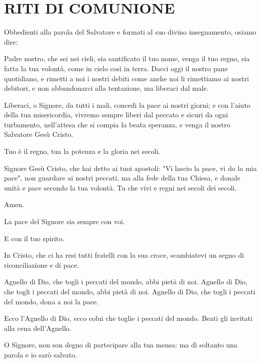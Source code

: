 

\section*{RITI DI COMUNIONE}

	\begin{dialoghi}
		\item[\sacerdote] Obbedienti alla parola del Salvatore e formati al suo divino insegnamento, osiamo dire:
		\item[\assemblea] Padre nostro, che sei nei cieli, sia santificato il tuo nome, venga il tuo regno, sia fatta la tua volontà, come in cielo così in terra. Dacci oggi il nostro pane quotidiano, e rimetti a noi i nostri debiti come anche noi li rimettiamo ai nostri debitori, e non abbandonarci alla tentazione, ma liberaci dal male.
		\item[\sacerdote] Liberaci, o Signore, da tutti i mali, concedi la pace ai nostri giorni; e con l'aiuto della tua misericordia, vivremo sempre liberi dal peccato e sicuri da ogni turbamento, nell'attesa che si compia la beata speranza, e venga il nostro Salvatore Gesù Cristo.
		\item[\assemblea] Tuo è il regno, tua la potenza e la gloria nei secoli.
		\item[\sacerdote] Signore Gesù Cristo, che hai detto ai tuoi apostoli: "Vi lascio la pace, vi do la mia pace", non guardare ai nostri peccati, ma alla fede della tua Chiesa, e donale unità e pace secondo la tua volontà. Tu che vivi e regni nei secoli dei secoli.
		\item[\assemblea] Amen.
		\item[\sacerdote] La pace del Signore sia sempre con voi.
		\item[\assemblea] E con il tuo spirito.
		\item[\sacerdote] In Cristo, che ci ha resi tutti fratelli con la sua croce, scambiatevi un segno di riconciliazione e di pace.

		\item[\assemblea] Agnello di Dio, che togli i peccati del mondo, abbi pietà di noi. Agnello di Dio, che togli i peccati del mondo, abbi pietà di noi. Agnello di Dio, che togli i peccati del mondo, dona a noi la pace.
		\item[\sacerdote] Ecco l'Agnello di Dio, ecco colui che toglie i peccati del mondo. Beati gli invitati alla cena dell'Agnello.
		\item[\assemblea] O Signore, non son degno di partecipare alla tua mensa: ma dì soltanto una parola e io sarò salvato.
	\end{dialoghi}

